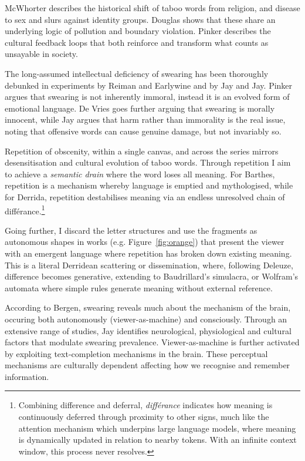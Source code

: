 \documentclass[12pt]{article}
\begin{document}
McWhorter describes the historical shift of taboo words from religion,
and disease to sex and slurs against identity
groups.\cite{mcwhorter2024nine} Douglas shows that these share an
underlying logic of pollution and boundary violation.\cite{douglas1966purity}
Pinker describes the cultural feedback loops that both reinforce and
transform what counts as unsayable in society\cite{pinker2008seven}.

The long-assumed intellectual deficiency of swearing has been
thoroughly debunked in experiments by Reiman and
Earlywine\cite{reiman2022swearfluency} and by Jay and
Jay.\cite{jay2015taboo} Pinker argues that
swearing is not inherently immoral, instead it is an evolved form of
emotional language.\cite{pinker2017moral} De Vries goes further arguing that swearing is
morally innocent,\cite{devries2023swearing} while Jay argues that harm
rather than immorality is the real issue, noting that offensive words
can cause genuine damage, but not invariably so.\cite{jay2009offensive}

Repetition of obscenity, within a single canvas, and across the series
mirrors desensitisation and cultural evolution of taboo words.
Through repetition I aim to achieve a \emph{semantic drain} where the
word loses all meaning. For Barthes, repetition is a mechanism whereby
language is emptied and mythologised,\cite{barthes1957mythologies}
while for Derrida,\cite{derrida1972dissemination} repetition
destabilises meaning via an endless unresolved chain of
diff\'erance.\footnote{Combining difference and deferral,
  \emph{diff\'erance} indicates how meaning is continuously deferred
  through proximity to other signs, much like the attention mechanism
  which underpins large language models, where meaning is dynamically
  updated in relation to nearby tokens. With an infinite context
  window, this process never resolves.}

Going further, I discard the letter structures and use the fragments
as autonomous shapes in works (e.g. Figure~\ref{fig:orange}) that
present the viewer with an emergent language where repetition has
broken down existing meaning. This is a literal Derridean scattering
or dissemination,\cite{derrida1972dissemination} where, following
Deleuze,\cite{deleuze1968difference} difference becomes generative,
extending to Baudrillard's simulacra,\cite{baudrillard1981simulacra}
or Wolfram's automata\cite{wolfram} where simple rules generate
meaning without external reference.

According to Bergen, swearing reveals much about the mechanism of the
brain, occuring both autonomously (viewer-as-machine) and
consciously.\cite{bergen2018what} Through an extensive range of
studies, Jay identifies neurological, physiological and cultural
factors that modulate swearing prevalence.\cite{jay1999why}
Viewer-as-machine is further activated by exploiting text-completion
mechanisms in the
brain.\cite{Taylor1953,Reicher1969,Healy1976,GraingerWhitney2004,CohenDehaene2000,Levy2008} These
perceptual mechanisms are culturally
dependent\cite{Bartlett1932,Hall1976,ChuaBolandNisbett2005,MasudaNisbett2001}
affecting how we recognise and remember information.
\end{document}
